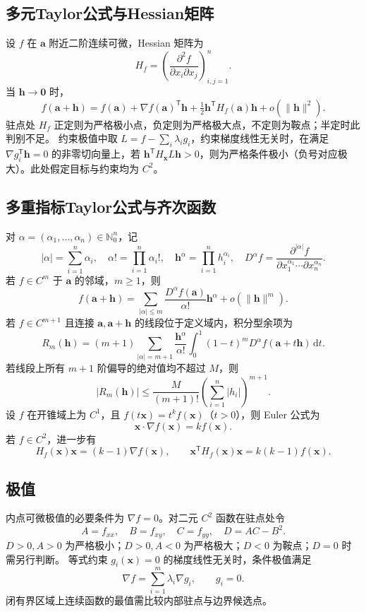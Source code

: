 \documentclass[../main.tex]{subfiles}
\begin{document}
\subsection{多元Taylor公式与Hessian矩阵}
设 $f$ 在 $\bm a$ 附近二阶连续可微，Hessian 矩阵为
\[
H_f=\left(\frac{\partial^2f}{\partial x_i\partial x_j}\right)_{i,j=1}^n.
\]
当 $\bm h\to\bm0$ 时，
\[
f(\bm a+\bm h)=f(\bm a)+\nabla f(\bm a)^{\mathsf T}\bm h
+\tfrac12\bm h^{\mathsf T}H_f(\bm a)\bm h+o(\|\bm h\|^2).
\]
驻点处 $H_f$ 正定则为严格极小点，负定则为严格极大点，不定则为鞍点；半定时此判别不足。
约束极值中取 $L=f-\sum_i\lambda_i g_i$，约束梯度线性无关时，在满足 $\nabla g_i^{\mathsf T}\bm h=0$ 的非零切向量上，若 $\bm h^{\mathsf T}H_{\bm x}L\bm h>0$，则为严格条件极小（负号对应极大）。此处假定目标与约束均为 $C^2$。
\subsection{多重指标Taylor公式与齐次函数}
对 $\alpha=(\alpha_1,\ldots,\alpha_n)\in\mathbb N_0^n$，记
\[
|\alpha|=\sum_{i=1}^n\alpha_i,\quad
\alpha!=\prod_{i=1}^n\alpha_i!,\quad
\bm h^\alpha=\prod_{i=1}^nh_i^{\alpha_i},\quad
D^\alpha f=\frac{\partial^{|\alpha|}f}{\partial x_1^{\alpha_1}\cdots\partial x_n^{\alpha_n}}.
\]
若 $f\in C^m$ 于 $\bm a$ 的邻域，$m\ge1$，则
\[
f(\bm a+\bm h)=\sum_{|\alpha|\le m}
\frac{D^\alpha f(\bm a)}{\alpha!}\bm h^\alpha+o(\|\bm h\|^m).
\]
若 $f\in C^{m+1}$ 且连接 $\bm a,\bm a+\bm h$ 的线段位于定义域内，积分型余项为
\[
R_m(\bm h)=(m+1)\sum_{|\alpha|=m+1}\frac{\bm h^\alpha}{\alpha!}
\int_0^1(1-t)^mD^\alpha f(\bm a+t\bm h)\,\mathrm dt.
\]
若线段上所有 $m+1$ 阶偏导的绝对值均不超过 $M$，则
\[
|R_m(\bm h)|\le\frac{M}{(m+1)!}
\left(\sum_{i=1}^n|h_i|\right)^{m+1}.
\]
设 $f$ 在开锥域上为 $C^1$，且 $f(t\bm x)=t^kf(\bm x)$（$t>0$），则 Euler 公式为
\[
\bm x\cdot\nabla f(\bm x)=kf(\bm x).
\]
若 $f\in C^2$，进一步有
\[
H_f(\bm x)\bm x=(k-1)\nabla f(\bm x),\qquad
\bm x^{\mathsf T}H_f(\bm x)\bm x=k(k-1)f(\bm x).
\]
\subsection{极值}
内点可微极值的必要条件为 $\nabla f=0$。对二元 $C^2$ 函数在驻点处令
\[
A=f_{xx},\quad B=f_{xy},\quad C=f_{yy},\quad D=AC-B^2.
\]
$D>0,A>0$ 为严格极小；$D>0,A<0$ 为严格极大；$D<0$ 为鞍点；$D=0$ 时需另行判断。
等式约束 $g_i(\bm x)=0$ 的梯度线性无关时，条件极值满足
\[
\nabla f=\sum_{i=1}^m\lambda_i\nabla g_i,\qquad g_i=0.
\]
闭有界区域上连续函数的最值需比较内部驻点与边界候选点。
\end{document}
